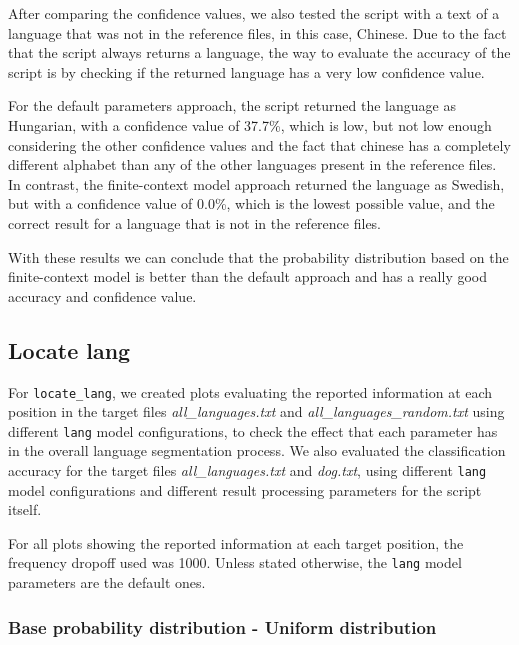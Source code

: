 \documentclass{article}
\begin{document}
After comparing the confidence values, we also tested the script with a text of a language that was not in the reference files, in this case, Chinese.
Due to the fact that the script always returns a language, the way to evaluate the accuracy of the script is by checking if the returned language has a very low confidence value.

For the default parameters approach, the script returned the language as Hungarian, with a confidence value of 37.7\%, which is low, but not low enough considering the other confidence values and
the fact that chinese has a completely different alphabet than any of the other languages present in the reference files.
In contrast, the finite-context model approach returned the language as Swedish, but with a confidence value of 0.0\%, which is the lowest possible value, and the correct result
for a language that is not in the reference files.

With these results we can conclude that the probability distribution based on the finite-context model is better than the default approach and has a really good accuracy and confidence value.

\subsection{Locate lang}
\label{subsec:results_locate_lang}

For \texttt{locate_lang}, we created plots evaluating the reported information at each position in the target files \textit{all\_languages.txt} and \textit{all\_languages\_random.txt} using different \texttt{lang} model configurations, to check the effect that each parameter has in the overall language segmentation process.
We also evaluated the classification accuracy for the target files \textit{all\_languages.txt} and \textit{dog.txt}, using different \texttt{lang} model configurations and different result processing parameters for the script itself.

For all plots showing the reported information at each target position, the frequency dropoff used was 1000.
Unless stated otherwise, the \texttt{lang} model parameters are the default ones.

\subsubsection{Base probability distribution - Uniform distribution}
\label{subsubsec:results_locate_lang_uniform_distribution}
\end{document}
